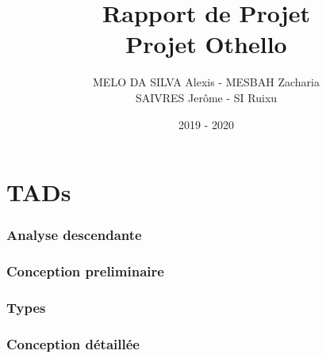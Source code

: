 \documentclass[french]{extarticle}
\begin{document}
\title{Rapport de Projet\\
	Projet Othello}
\author{MELO DA SILVA Alexis - MESBAH Zacharia\\
SAIVRES Jerôme - SI Ruixu}
\date{2019 - 2020}
\maketitle
\newpage
\tableofcontents
\newpage
\part{TADs}

\newpage
\section{Analyse descendante}

\newpage
\section{Conception preliminaire}



\newpage
\section{Types}

\newpage
\section{Conception détaillée}









\end{document}
